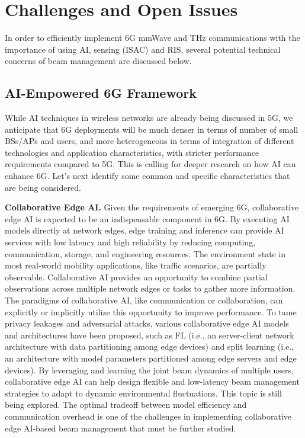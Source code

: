 \documentclass[journal,comsoc]{IEEEtran}
\begin{document}
\section{Challenges and Open Issues}
In order to efficiently implement 6G mmWave and THz communications with the importance of using AI, sensing (ISAC) and RIS, several potential technical concerns of beam management are discussed below.


\subsection{AI-Empowered 6G Framework}
While AI techniques in wireless networks are already being discussed in 5G, we anticipate that 6G deployments will be much denser in terms of number of small BSs/APs and users, and more heterogeneous in terms of integration of different technologies and application characteristics, with stricter performance requirements compared to 5G. This is calling for deeper research on how AI can enhance 6G. Let's next identify some common and specific characteristics that are being considered.


{\bf{Collaborative Edge AI.}} Given the requirements of emerging 6G, collaborative edge AI is expected to be an indispensable component in 6G. By executing AI models directly at network edges, edge training and inference can provide AI services with low latency and high reliability by reducing computing, communication, storage, and engineering resources. The environment state in most real-world mobility applications, like traffic scenarios, are partially observable. Collaborative AI provides an opportunity to combine partial observations across multiple network edges or tasks to gather more information. The paradigms of collaborative AI, like communication or collaboration, can explicitly or implicitly utilize this opportunity to improve performance. To tame privacy leakages and adversarial attacks, various collaborative edge AI models and architectures have been proposed, such as FL (i.e., an server-client network architecture with data partitioning among edge devices) and split learning (i.e., an architecture with model parameters partitioned among edge servers and edge devices). By leveraging and learning the joint beam dynamics of multiple users, collaborative edge AI can help design flexible and low-latency beam management strategies to adapt to dynamic environmental fluctuations. This topic is still being explored. The optimal tradeoff between model efficiency and communication overhead is one of the challenges in implementing collaborative edge AI-based beam management that must be further studied.
\end{document}
